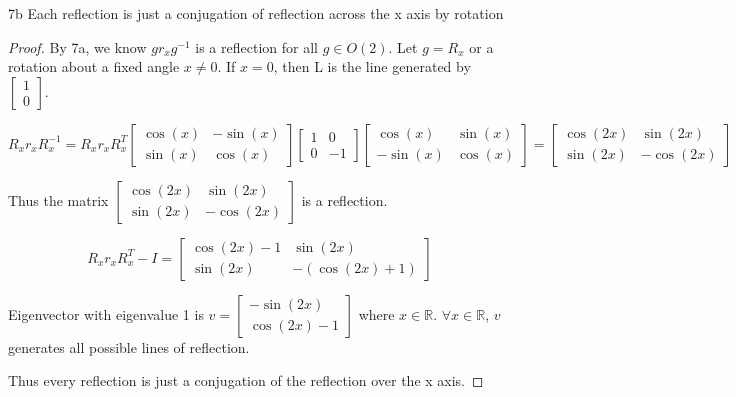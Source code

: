 \documentclass{article}
\newcommand{\R}{\mathbb{R}}
\begin{document}
\begin{claim}{7b}
    Each reflection is just a conjugation of reflection across the x axis by rotation
\end{claim}
\begin{proof}
    By 7a, we know $gr_xg^{-1}$ is a reflection for all $g \in O(2)$. Let $g = R_x$ or a rotation about a fixed angle $x \neq 0$. If $x = 0$, then L is the line generated by $\begin{bmatrix}
        1 \\ 0
    \end{bmatrix}$. 

    \[
        R_xr_xR_x^{-1} = R_x r_x R_x^{T}
        \begin{bmatrix}
            \cos(x) & -\sin(x) \\ \sin(x) & \cos(x)
        \end{bmatrix} \begin{bmatrix}
            1 & 0 \\ 0 & -1
        \end{bmatrix} \begin{bmatrix}
            \cos(x) & \sin(x) \\ -\sin(x)  & \cos(x)
        \end{bmatrix} = \begin{bmatrix}
            \cos(2x) & \sin(2x) \\ \sin(2x) & -\cos(2x)
        \end{bmatrix}
    \]

    Thus the matrix $\begin{bmatrix}
        \cos(2x) & \sin(2x) \\ \sin(2x) & -\cos(2x)
    \end{bmatrix}$ is a reflection. 

    \[
        R_x r_x R_x^{T} - I = \begin{bmatrix}
            \cos(2x) - 1 & \sin(2x) \\ \sin(2x) & -(\cos(2x) + 1)
        \end{bmatrix}
    \]

    Eigenvector with eigenvalue 1 is $v = \begin{bmatrix}
        -\sin(2x) \\ \cos(2x) - 1
    \end{bmatrix}$ where $x \in \R$. $\forall x \in \R$, $v$ generates all possible lines of reflection.

    Thus every reflection is just a conjugation of the reflection over the x axis.
\end{proof}
\end{document}
